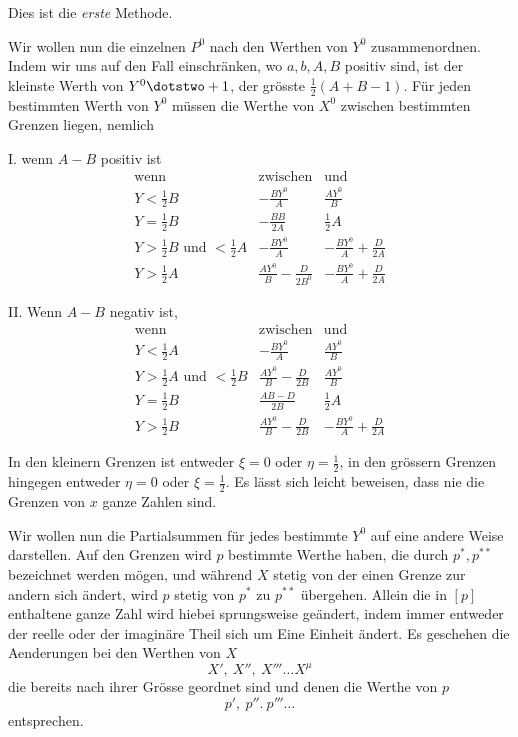 Dies ist die \emph{erste} Methode.

Wir wollen nun die einzelnen $P^0$ nach den Werthen von $Y^0$ zusammenordnen. Indem wir uns auf den Fall einschränken, wo $a,b,A,B$ positiv sind, ist der kleinste Werth von $Y^0\dotstwo+1$, der grösste $\frac12(A+B-1)$. Für jeden bestimmten Werth von $Y^0$ müssen die Werthe von $X^0$ zwischen bestimmten Grenzen liegen, nemlich

I. wenn $A-B$ positiv ist
\[
\begin{array}{c|c|c}
\text{wenn}&\text{zwischen}&\text{und}\\
Y<\frac12B&-\frac{BY^0}{A}&\frac{AY^0}{B}\\[5pt]
Y=\frac12B&-\frac{BB}{2A}&\frac12A\\[5pt]
Y>\frac12B\text{ und }<\frac12A&-\frac{BY^0}{A}&-\frac{BY^0}{A}+\frac{D}{2A}\\[5pt]
Y>\frac12A&\frac{AY^0}{B}-\frac{D}{2B^0}&-\frac{BY^0}{A}+\frac{D}{2A}
\end{array}
\]

II. Wenn $A-B$ negativ ist,
\[
\begin{array}{c|c|c}
\text{wenn}&\text{zwischen}&\text{und}\\
Y<\frac12A&-\frac{BY^0}{A}&\frac{AY^0}{B}\\[5pt]
Y>\frac12A\text{ und }<\frac12B&\frac{AY^0}{B}-\frac{D}{2B}&\frac{AY^0}{B}\\[5pt]
Y=\frac12B&\frac{AB-D}{2B}&\frac12A\\[5pt]
Y>\frac12B&\frac{AY^0}{B}-\frac{D}{2B}&-\frac{BY^0}{A}+\frac{D}{2A}
\end{array}
\]

In den kleinern Grenzen ist entweder $\xi=0$ oder $\eta=\frac12$, in den grössern Grenzen hingegen entweder $\eta=0$ oder $\xi=\frac12$. Es lässt sich leicht beweisen, dass nie die Grenzen von $x$ ganze Zahlen sind.

Wir wollen nun die Partialsummen für jedes bestimmte $Y^0$ auf eine andere Weise darstellen. Auf den Grenzen wird $p$ bestimmte Werthe haben, die durch $p^*,p^{**}$ bezeichnet werden mögen, und während $X$ stetig von der einen Grenze zur andern sich ändert, wird $p$ stetig von $p^*$ zu $p^{**}$ übergehen. Allein die in $[p]$ enthaltene ganze Zahl wird hiebei sprungsweise geändert, indem immer entweder der reelle oder der imaginäre Theil sich um Eine Einheit ändert. Es geschehen die Aenderungen bei den Werthen von $X$
\[
X',\ X'',\ X'''\ldots X^\mu
\]
die bereits nach ihrer Grösse geordnet sind und denen die Werthe von $p$
\[
p',\ p''.\ p'''\ldots
\]
entsprechen.

